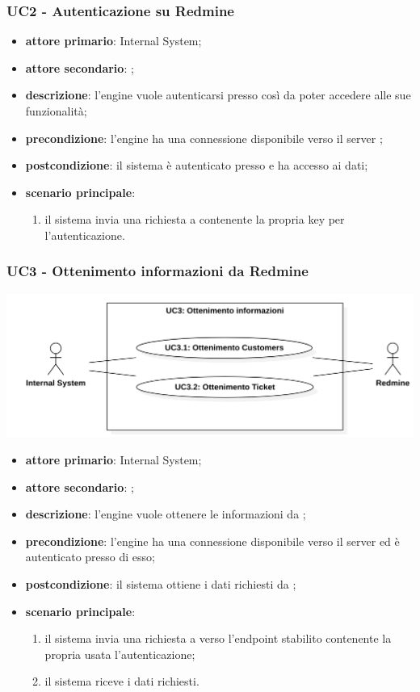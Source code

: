 \subsubsection{UC2 - Autenticazione su Redmine}
\begin{itemize}
	\item \textbf{attore primario}: Internal System;
	\item \textbf{attore secondario}: ;
	\item \textbf{descrizione}: l'engine vuole autenticarsi presso  così da poter accedere alle sue funzionalità;
	\item \textbf{precondizione}: l'engine ha una connessione disponibile verso il server ;
	\item \textbf{postcondizione}: il sistema è autenticato presso  e ha accesso ai dati;
	\item \textbf{scenario principale}: 
	\begin{enumerate}
		\item il sistema invia una richiesta a  contenente la propria   key per l'autenticazione.
	\end{enumerate}
\end{itemize}
\subsubsection{UC3 - Ottenimento informazioni da Redmine}
\begin{center}
	\includegraphics[keepaspectratio = true, width=15cm]{immagini/uc/2.png}
\end{center}
\begin{itemize}
	\item \textbf{attore primario}: Internal System;
	\item \textbf{attore secondario}: ;
	\item \textbf{descrizione}: l'engine vuole ottenere le informazioni da ;
	\item \textbf{precondizione}: l'engine ha una connessione disponibile verso il server  ed è autenticato presso di esso;
	\item \textbf{postcondizione}: il sistema ottiene i dati richiesti da ;
	\item \textbf{scenario principale}: 
	\begin{enumerate}
		\item il sistema invia una richiesta a  verso l'endpoint stabilito contenente la propria  usata l'autenticazione;
		\item il sistema riceve i dati richiesti.
	\end{enumerate}
\end{itemize}

